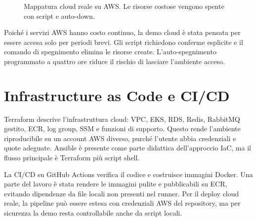 \documentclass[11pt,a4paper]{article}
\begin{document}
\begin{figure}[H]
\centering
{}
\caption{Mappatura cloud reale su AWS. Le risorse costose vengono spente con script e auto-down.}
\label{fig:aws}
\end{figure}

Poich\'e i servizi AWS hanno costo continuo, la demo cloud \`e stata pensata per essere accesa solo per periodi brevi. Gli script richiedono conferme esplicite e il comando di spegnimento elimina le risorse create. L'auto-spegnimento programmato a quattro ore riduce il rischio di lasciare l'ambiente acceso.

\section{Infrastructure as Code e CI/CD}

Terraform descrive l'infrastruttura cloud: VPC, EKS, RDS, Redis, RabbitMQ gestito, ECR, log group, SSM e funzioni di supporto. Questo rende l'ambiente riproducibile su un account AWS diverso, purch\'e l'utente abbia credenziali e quote adeguate. Ansible \`e presente come parte didattica dell'approccio IaC, ma il flusso principale \`e Terraform pi\`u script shell.

La CI/CD su GitHub Actions verifica il codice e costruisce immagini Docker. Una parte del lavoro \`e stata rendere le immagini pulite e pubblicabili su ECR, evitando dipendenze da file locali non presenti nel runner. Per il deploy cloud reale, la pipeline pu\`o essere estesa con credenziali AWS del repository, ma per sicurezza la demo resta controllabile anche da script locali.
\end{document}
